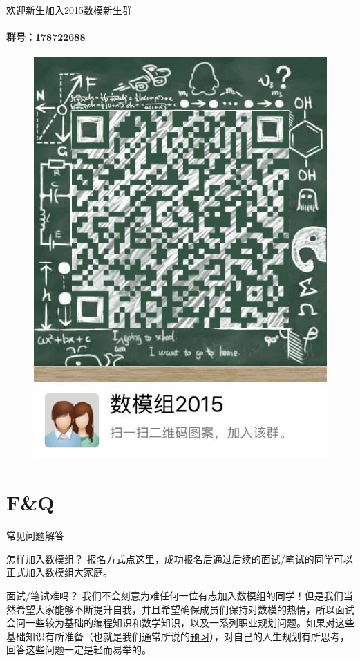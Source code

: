 \documentclass{beamer}
\begin{document}
\begin{frame}{欢迎新生加入2015数模新生群}
\framesubtitle{\faQq 群号：178722688}
	\begin{figure}
		
		\includegraphics[width=.45\textwidth]{qq.jpg}
		\label{qun}
	\end{figure}

\end{frame}

\section{F\&Q}
\begin{frame}{\faQuestionCircle 常见问题解答}
\begin{alertblock}{怎样加入数模组？}
报名方式\textcolor{red}{\hyperlink{signin}{点这里}}，成功报名后通过后续的面试/笔试的同学可以正式加入数模组大家庭。
\end{alertblock}

\begin{block}{面试/笔试难吗？}
我们不会刻意为难任何一位有志加入数模组的同学！但是我们当然希望大家能够不断提升自我，并且希望确保成员们保持对数模的热情，所以面试会问一些较为基础的编程知识和数学知识，以及一系列职业规划问题。如果对这些基础知识有所准备（也就是我们通常所说的\textcolor{blue}{\hyperlink{sec:preview}{预习}}），对自己的人生规划有所思考，回答这些问题一定是轻而易举的。

\end{block}

\end{frame}
\end{document}
